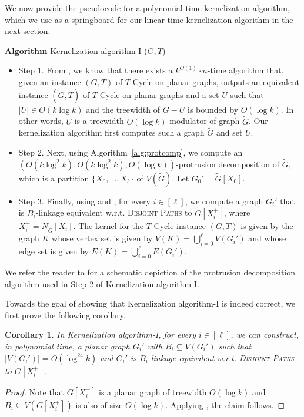 \documentclass{article}
\newtheorem{corollary}[theorem]{Corollary}
\numberwithin{claimcounter}{lemma}
\newcommand{\dispaths}{\textsc{Disjoint Paths}\xspace}
\begin{document}
We now provide the pseudocode for a polynomial time kernelization algorithm, which we  use as a springboard for our linear time kernelization algorithm in the next section.

\noindent
{\bf Algorithm} {\sc Kernelization algorithm-I} ($G,T$)
\begin{itemize}
\item  Step 1. From , we know that there exists a $k^{O(1)}\cdot n$-time algorithm that, given an instance $(G,T)$ of {\sc $T$-Cycle} on planar graphs, outputs an equivalent instance $(\tilde{G},T)$ of {\sc $T$-Cycle} on planar graphs and  a set $U$ such that $|U|\in O(k\log k)$ and the treewidth of $\tilde{G}-U$ is bounded by $O(\log k)$. In other words, $U$ is a treewidth-$O(\log k)$-modulator of graph $\tilde{G}$. Our kernelization algorithm first computes such a graph $\tilde{G}$ and set $U$.

\item Step 2. Next, using Algorithm~\ref{alg:protcomp}, we compute an $(O(k \log^2 k), O(k \log^2 k), O(\log k))$-protrusion decomposition of $\tilde{G}$, which is a partition $\{X_0,\dots,X_\ell\}$ of $V(\tilde{G})$. Let $G_0' = \tilde{G}[X_0]$.

\item Step 3. Finally, using  and , for every $i \in [\ell]$, we  compute a graph $G_i' $ that is $B_i$-linkage equivalent w.r.t. \dispaths to $\tilde{G}[X_i^+]$, where $X_i^+ = N_{\tilde{G}}[X_i]$. The kernel for the  {\sc $T$-Cycle} instance $(G,T)$ is given by the graph $K$ whose vertex set is given by $V(K) =  \bigcup_{i=0}^\ell V(G_i')$ and whose edge set is given by $E(K) = \bigcup_{i=0}^\ell E(G_i')$.

\end{itemize}  

We refer the reader to  for a schematic depiction of the protrusion decomposition algorithm used in Step 2 of {\sc Kernelization algorithm-I}.

 Towards the goal of showing that {\sc Kernelization algorithm-I} is indeed correct,  we first prove the following corollary.

\begin{corollary} \label{cor:outline:polyKer} 
In {\sc Kernelization algorithm-I}, for every $i \in [\ell]$, we can construct, in polynomial time, a planar graph $G_i'$ with $B_i \subseteq V(G_i')$ such that $|V(G_i')| = O(\log^{24}k)$ and $G_i'$ is $B_i$-linkage equivalent w.r.t. \dispaths to $\tilde{G}[X_i^+]$.
\end{corollary}
\begin{proof}
    Note that $G[X_i^+]$ is a planar graph of treewidth $O(\log k)$ and $B_i \subseteq V(G[X_i^+])$ is also of size $O(\log k)$.
    Applying  , the claim follows.
\end{proof}
\end{document}
